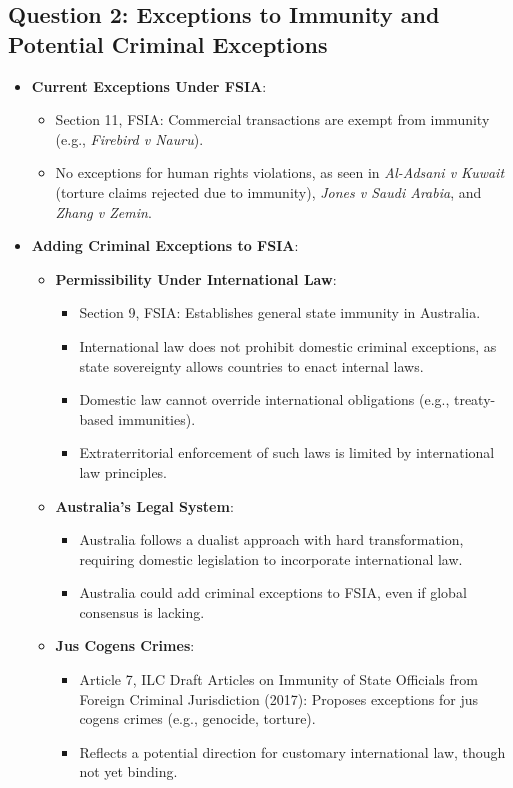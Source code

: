 \subsection{Question 2: Exceptions to Immunity and Potential Criminal Exceptions}
\begin{itemize}
    \item \textbf{Current Exceptions Under FSIA}:
    \begin{itemize}
        \item Section 11, FSIA: Commercial transactions are exempt from immunity (e.g., \textit{Firebird v Nauru}).
        \item No exceptions for human rights violations, as seen in \textit{Al-Adsani v Kuwait} (torture claims rejected due to immunity), \textit{Jones v Saudi Arabia}, and \textit{Zhang v Zemin}.
    \end{itemize}
    \item \textbf{Adding Criminal Exceptions to FSIA}:
    \begin{itemize}
        \item \textbf{Permissibility Under International Law}:
        \begin{itemize}
            \item Section 9, FSIA: Establishes general state immunity in Australia.
            \item International law does not prohibit domestic criminal exceptions, as state sovereignty allows countries to enact internal laws.
            \item Domestic law cannot override international obligations (e.g., treaty-based immunities).
            \item Extraterritorial enforcement of such laws is limited by international law principles.
        \end{itemize}
        \item \textbf{Australia’s Legal System}:
        \begin{itemize}
            \item Australia follows a dualist approach with hard transformation, requiring domestic legislation to incorporate international law.
            \item Australia could add criminal exceptions to FSIA, even if global consensus is lacking.
        \end{itemize}
        \item \textbf{Jus Cogens Crimes}:
        \begin{itemize}
            \item Article 7, ILC Draft Articles on Immunity of State Officials from Foreign Criminal Jurisdiction (2017): Proposes exceptions for jus cogens crimes (e.g., genocide, torture).
            \item Reflects a potential direction for customary international law, though not yet binding.
        \end{itemize}
    \end{itemize}
\end{itemize}

